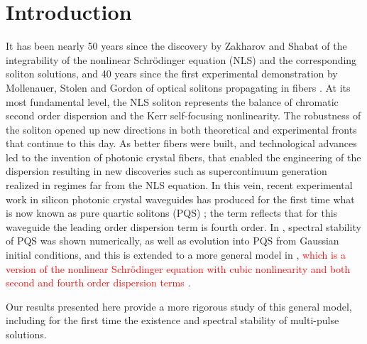 \documentclass[12pt]{elsarticle}
\newcommand{\revised}[1]{ \textcolor{red}{#1} }
\begin{document}
\section{Introduction}
It has been nearly 50 years since the discovery by Zakharov and Shabat \cite{Zak72} of the integrability of the nonlinear Schr\"odinger equation (NLS) and the corresponding soliton solutions, and 40 years since the first experimental demonstration by Mollenauer, Stolen and Gordon of optical solitons propagating in fibers \cite{Moll80}. At its most fundamental level, the NLS soliton represents the balance of chromatic second order dispersion and the Kerr self-focusing nonlinearity. The robustness of the soliton opened up new directions in both theoretical and experimental fronts that continue to this day. As better fibers were built, and technological advances led to the invention of photonic crystal fibers, that enabled the engineering of the dispersion resulting in new discoveries such as supercontinuum generation realized in regimes far from the NLS equation. In this vein, recent experimental work in silicon photonic crystal waveguides has produced for the first time what is now known as pure quartic solitons (PQS) \cite{BlancoPQS}; the term reflects that for this waveguide the leading order dispersion term is fourth order. In \cite{Tam2019}, spectral stability of PQS was shown numerically, as well as evolution into PQS from Gaussian initial conditions, and this is extended to a more general model in \cite{Tam2020}, \revised{which is a version of the nonlinear Schr{\"o}dinger equation with cubic nonlinearity and both second and fourth order dispersion terms}.

 Our results presented here provide a more rigorous study of this general model, including for the first time the existence and spectral stability of multi-pulse solutions.
\end{document}
